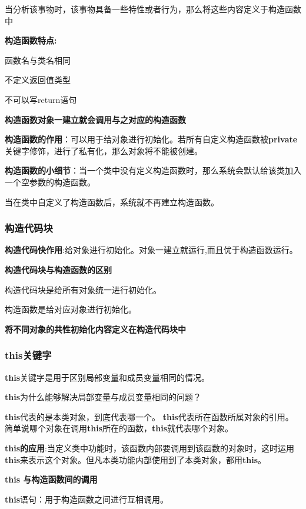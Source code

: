 \documentclass[UTF8]{ctexart}
\begin{document}
当分析该事物时，该事物具备一些特性或者行为，那么将这些内容定义于构造函数中

\textbf{构造函数特点:}

\textbullet 函数名与类名相同

\textbullet 不定义返回值类型

\textbullet 不可以写return语句

\textbf{构造函数对象一建立就会调用与之对应的构造函数}

\textbf{构造函数的作用}：可以用于给对象进行初始化。若所有自定义构造函数被\textbf{private}关键字修饰，进行了私有化，那么对象将不能被创建。

\textbf{构造函数的小细节}：当一个类中没有定义构造函数时，那么系统会默认给该类加入一个空参数的构造函数。

当在类中自定义了构造函数后，系统就不再建立构造函数。

\subsubsection{构造代码块}
\textbf{构造代码快作用}:给对象进行初始化。对象一建立就运行,而且优于构造函数运行。

\textbf{构造代码块与构造函数的区别}

\textbullet 构造代码块是给所有对象统一进行初始化。

\textbullet 构造函数是给对应对象进行初始化。

\textbf{将不同对象的共性初始化内容定义在构造代码块中}
\subsubsection{this关键字}
\textbf{this}关键字是用于区别局部变量和成员变量相同的情况。

\textbf{this}为什么能够解决局部变量与成员变量相同的问题？

\textbf{this}代表的是本类对象，到底代表哪一个。
\textbf{this}代表所在函数所属对象的引用。
简单说哪个对象在调用\textbf{this}所在的函数，\textbf{this}就代表哪个对象。

\textbf{this的应用}:当定义类中功能时，该函数内部要调用到该函数的对象时，这时运用\textbf{this}来表示这个对象。但凡本类功能内部使用到了本类对象，都用\textbf{this}。



\textbf{this 与构造函数间的调用}

\textbf{this}语句：用于构造函数之间进行互相调用。
\end{document}
